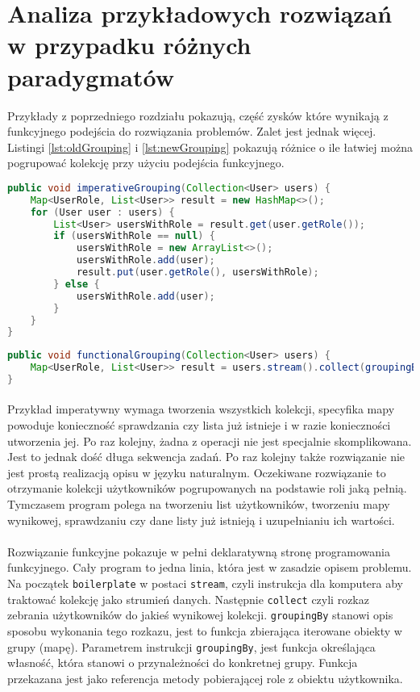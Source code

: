 \documentclass[a4paper,10pt]{report}
\begin{document}
\section{Analiza przykładowych rozwiązań w przypadku różnych paradygmatów}
Przykłady z poprzedniego rozdziału pokazują, część zysków które wynikają z funkcyjnego podejścia do rozwiązania problemów. Zalet jest jednak więcej. Listingi \ref{lst:oldGrouping}  i \ref{lst:newGrouping} pokazują różnice o ile łatwiej można pogrupować kolekcję przy użyciu podejścia funkcyjnego.
\begin{lstlisting}[caption={Podejście imperatywne},label={lst:oldGrouping},language=Java]
public void imperativeGrouping(Collection<User> users) {
    Map<UserRole, List<User>> result = new HashMap<>();
    for (User user : users) {
	    List<User> usersWithRole = result.get(user.getRole());
	    if (usersWithRole == null) {
		    usersWithRole = new ArrayList<>();
		    usersWithRole.add(user);
		    result.put(user.getRole(), usersWithRole);
	    } else {
		    usersWithRole.add(user);
	    }
    }
}
\end{lstlisting}
\begin{lstlisting}[caption={Podejście funkcyjne},label={lst:newGrouping},language=Java]
public void functionalGrouping(Collection<User> users) {
	Map<UserRole, List<User>> result = users.stream().collect(groupingBy(User::getRole));
}
\end{lstlisting}
\paragraph{}
Przykład imperatywny wymaga tworzenia wszystkich kolekcji, specyfika mapy powoduje konieczność sprawdzania czy lista już istnieje i w razie konieczności utworzenia jej. Po raz kolejny, żadna z operacji nie jest specjalnie skomplikowana. Jest to jednak dość długa sekwencja zadań. Po raz kolejny także rozwiązanie nie jest prostą realizacją opisu w języku naturalnym. Oczekiwane rozwiązanie to otrzymanie kolekcji użytkowników pogrupowanych na podstawie roli jaką pełnią. Tymczasem program polega na tworzeniu list użytkowników, tworzeniu mapy wynikowej, sprawdzaniu czy dane listy już istnieją i uzupełnianiu ich wartości. 
\paragraph{}
Rozwiązanie funkcyjne pokazuje w pełni deklaratywną stronę programowania funkcyjnego. Cały program to jedna linia, która jest w zasadzie opisem problemu. Na początek \verb|boilerplate| w postaci \verb|stream|, czyli instrukcja dla komputera aby traktować kolekcję jako strumień danych. Następnie \verb|collect| czyli rozkaz zebrania użytkowników do jakieś wynikowej kolekcji. \verb|groupingBy| stanowi opis sposobu wykonania tego rozkazu, jest to funkcja zbierająca iterowane obiekty w grupy (mapę). Parametrem instrukcji \verb|groupingBy|, jest funkcja określająca własność, która stanowi o przynależności do konkretnej grupy. Funkcja przekazana jest jako referencja metody pobierającej role z obiektu użytkownika.
\end{document}
